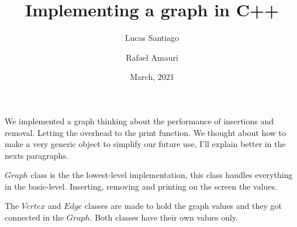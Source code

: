 \documentclass{article}
\title{Implementing a graph in C++}
\author{Lucas Santiago \and Rafael Amauri}
\date{March, 2021}
\begin{document}
\maketitle

\hspace{4pt}We implemented a graph thinking about the performance of insertions and removal.
Letting the overhead to the print function. We thought about how to make a very generic object
to simplify our future use, I'll explain better in the nexts paragraphs.

$Graph$ class is the the lowest-level implementation, this class handles 
everything in the basic-level. Inserting, removing and printing on the screen the values.

The $Vertex$ and $Edge$ classes are made to hold the graph values and they got connected in the $Graph$.
Both classes have their own values only.
\end{document}
